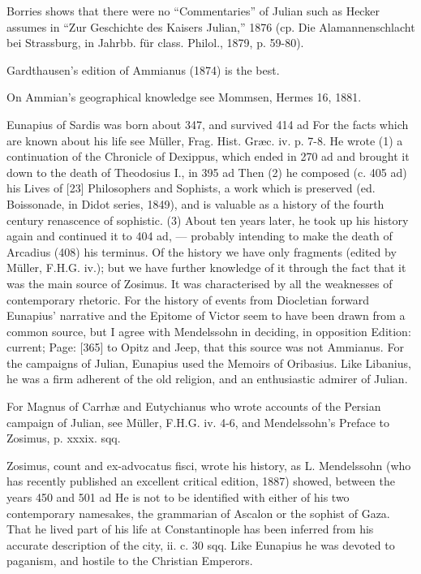 Borries shows that there were no \texthebrew{“}Commentaries\texthebrew{}” of Julian such as Hecker assumes in \texthebrew{“}Zur Geschichte des Kaisers Julian,\texthebrew{}” 1876 (cp. Die Alamannenschlacht bei Strassburg, in Jahrbb. für class. Philol., 1879, p. 59-80).

Gardthausen\texthebrew{}’s edition of Ammianus (1874) is the best.

On Ammian\texthebrew{}’s geographical knowledge see Mommsen, Hermes 16, 1881.

Eunapius of Sardis was born about 347, and survived 414 ad For the facts which are known about his life see Müller, Frag. Hist. Græc. iv. p. 7-8. He wrote (1) a continuation of the Chronicle of Dexippus, which ended in 270 ad and brought it down to the death of Theodosius I., in 395 ad Then (2) he composed (c. 405 ad) his Lives of [23] Philosophers and Sophists, a work which is preserved (ed. Boissonade, in Didot series, 1849), and is valuable as a history of the fourth century renascence of sophistic. (3) About ten years later, he took up his history again and continued it to 404 ad, \texthebrew{—} probably intending to make the death of Arcadius (408) his terminus. Of the history we have only fragments (edited by Müller, F.H.G. iv.); but we have further knowledge of it through the fact that it was the main source of Zosimus. It was characterised by all the weaknesses of contemporary rhetoric. For the history of events from Diocletian forward Eunapius\texthebrew{}’ narrative and the Epitome of Victor seem to have been drawn from a common source, but I agree with Mendelssohn in deciding, in opposition Edition: current; Page: [365] to Opitz and Jeep, that this source was not Ammianus. For the campaigns of Julian, Eunapius used the Memoirs of Oribasius. Like Libanius, he was a firm adherent of the old religion, and an enthusiastic admirer of Julian.

For Magnus of Carrhæ and Eutychianus who wrote accounts of the Persian campaign of Julian, see Müller, F.H.G. iv. 4-6, and Mendelssohn\texthebrew{}’s Preface to Zosimus, p. xxxix. sqq.

Zosimus, count and ex-advocatus fisci, wrote his history, as L. Mendelssohn (who has recently published an excellent critical edition, 1887) showed, between the years 450 and 501 ad He is not to be identified with either of his two contemporary namesakes, the grammarian of Ascalon or the sophist of Gaza. That he lived part of his life at Constantinople has been inferred from his accurate description of the city, ii. c. 30 sqq. Like Eunapius he was devoted to paganism, and hostile to the Christian Emperors.

